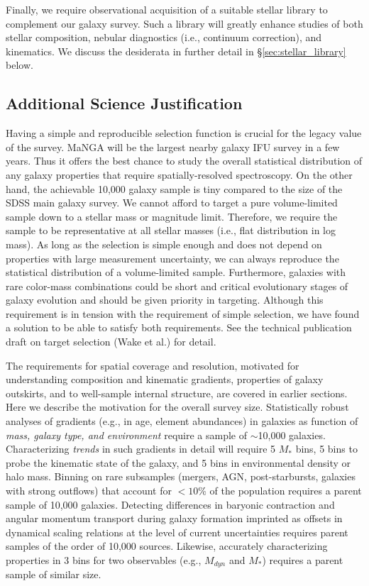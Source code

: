 \documentclass[preprint,11pt]{aastex}
\begin{document}

\medskip

Finally, we require observational acquisition of a suitable stellar
library to complement our galaxy survey. Such a library will greatly enhance studies of both stellar composition, nebular
diagnostics (i.e., continuum correction), and kinematics. We discuss
the desiderata in further detail in \S\ref{sec:stellar_library} below. 


\subsection{Additional Science Justification}

Having a simple and reproducible selection function is crucial for the
legacy value of the survey. MaNGA will be the largest nearby galaxy
IFU survey in a few years. Thus it offers the best chance to study the
overall statistical distribution of any galaxy properties that require
spatially-resolved spectroscopy.  On the other hand, the achievable
10,000 galaxy sample is tiny compared to the size of the SDSS main
galaxy survey. We cannot afford to target a pure volume-limited sample
down to a stellar mass or magnitude limit. Therefore, we require the
sample to be representative at all stellar masses (i.e., flat
distribution in log mass).  As long as the selection is simple enough
and does not depend on properties with large measurement uncertainty,
we can always reproduce the statistical distribution of a
volume-limited sample. Furthermore, galaxies with rare color-mass
combinations could be short and critical evolutionary stages of galaxy
evolution and should be given priority in targeting. Although this
requirement is in tension with the requirement of simple selection, we
have found a solution to be able to satisfy both requirements. See the
technical publication draft on target selection (Wake et al.) for
detail.

The requirements for spatial coverage and resolution, motivated for
understanding composition and kinematic gradients, properties of galaxy
outskirts, and to well-sample internal structure, are covered in
earlier sections. Here we describe the motivation for the overall
survey size. Statistically robust analyses of gradients (e.g., in age,
element abundances) in galaxies as function of {\em mass, galaxy type,
  and environment} require a sample of $\sim$10,000
galaxies. Characterizing {\em trends} in such gradients in detail will
require 5 $M_*$ bins, 5 bins to probe the kinematic state of the
galaxy, and 5 bins in environmental density or halo mass. Binning on
rare subsamples (mergers, AGN, post-starbursts, galaxies with strong
outflows) that account for $< 10$\% of the population requires a
parent sample of 10,000 galaxies. Detecting differences in baryonic
contraction and angular momentum transport during galaxy formation
imprinted as offsets in dynamical scaling relations at the level of
current uncertainties requires parent samples of the order of 10,000
sources.  Likewise, accurately characterizing properties in 3 bins for
two observables (e.g., $M_{dyn}$ and $M_*$) requires a parent sample
of similar size.
\end{document}
